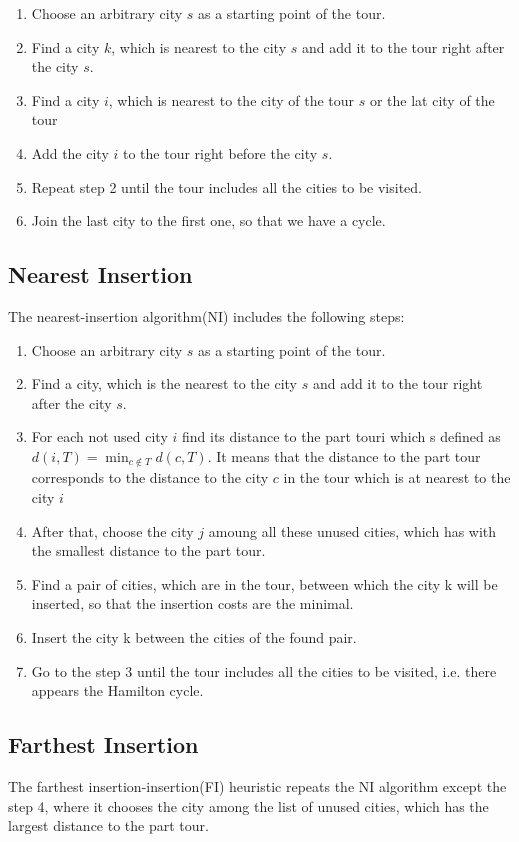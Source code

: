 \documentclass[a4paper, 12pt, headings=standardclasses]{scrartcl}
\begin{document}
\begin{enumerate}
	\item Choose an arbitrary city $s$ as a starting point of the tour.
	\item  Find a city $k$, which is nearest to the city $s$ and add it to the tour right after the city $s$.
	\item  Find a city $i$, which is nearest to the city of the tour $s$ or the lat city of the tour 
	\item  Add the city $i$ to the tour right before the city $s$.
	\item Repeat step 2 until the tour includes all the cities to be visited.
	\item Join the last city to the first one, so that we have a cycle.
\end{enumerate}
\subsection{Nearest Insertion}

The nearest-insertion algorithm(NI) includes the following steps:
\begin{enumerate}
	\item Choose an arbitrary city $s$ as a starting point of the tour.
	\item Find a city, which is the nearest to the city $s$ and add it to the tour right after the city $s$.
	\item For each not used city $i$ find its distance to the part touri which s defined as $d(i, T) = \min _{c \notin T}d(c, T)$. It means that the distance to the part tour corresponds to the distance to the city $c$ in the tour which is at nearest to the city $i$
	\item After that, choose the city $j$ amoung all these unused cities, which has with the smallest distance to the part tour.
	\item Find a pair of cities, which are in the tour, between which the city k will be inserted, so that
	the insertion costs are the minimal.
	\item Insert the city k between the cities of the found pair.
	\item Go to the step 3 until the tour includes all the cities to be visited, i.e. there appears the Hamilton cycle.
\end{enumerate}


\subsection{Farthest Insertion}
The farthest insertion-insertion(FI) heuristic repeats the NI algorithm except the step 4, where it chooses the city among the list of unused cities, which has the largest distance to the part tour. 
\end{document}
